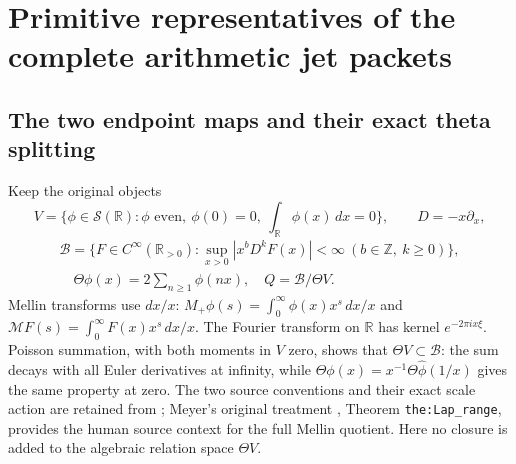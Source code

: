 \section{Primitive representatives of the complete arithmetic jet packets}


\subsection{The two endpoint maps and their exact theta splitting}
Keep the original objects
\[
 V=\{\phi\in\mathcal S(\mathbb R):\phi\text{ even},\
       \phi(0)=0,\ \int_{\mathbb R}\phi(x)\,dx=0\},\qquad D=-x\partial_x,
\]
\[
 \begin{gathered}\mathscr B=\{F\in C^\infty(\mathbb R_{>0}):
       \sup_{x>0}|x^bD^kF(x)|<\infty\ (b\in\mathbb Z,\ k\ge0)\},\\
 \quad \Theta\phi(x)=2\sum_{n\ge1}\phi(nx),\quad Q=\mathscr B/\Theta V.
 \end{gathered}\tag{PL1}\label{pl:pl:spaces}
\]
Mellin transforms use \(dx/x\): \(M_+\phi(s)=\int_0^\infty
\phi(x)x^s\,dx/x\) and \(\mathcal M F(s)=\int_0^\infty F(x)x^s\,dx/x\).
The Fourier transform on \(\mathbb R\) has kernel \(e^{-2\pi ix\xi}\).
Poisson summation, with both moments in \(V\) zero, shows that
\(\Theta V\subset\mathscr B\): the sum decays with all Euler derivatives at
infinity, while
\(\Theta\phi(x)=x^{-1}\Theta\widehat\phi(1/x)\) gives the same property
at zero. The two source conventions and their exact scale action are
retained from \cite{FJtau,PLoperator}; Meyer's original treatment
\cite{Meyer}, Theorem \texttt{the:Lap\_range}, provides the human
source context for the full Mellin quotient. Here no closure is added
to the algebraic relation space \(\Theta V\).

